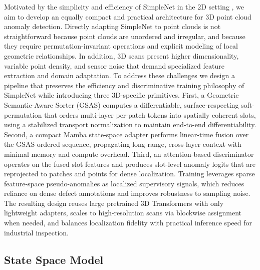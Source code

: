 Motivated by the simplicity and efficiency of SimpleNet in the 2D setting \cite{liu2023simplenet}, we aim to develop an equally compact and practical architecture for 3D point cloud anomaly detection. Directly adapting SimpleNet to point clouds is not straightforward because point clouds are unordered and irregular, and because they require permutation-invariant operations and explicit modeling of local geometric relationships. In addition, 3D scans present higher dimensionality, variable point density, and sensor noise that demand specialized feature extraction and domain adaptation. To address these challenges we design a pipeline that preserves the efficiency and discriminative training philosophy of SimpleNet while introducing three 3D-specific primitives. First, a Geometric Semantic-Aware Sorter (GSAS) computes a differentiable, surface-respecting soft-permutation that orders multi-layer per-patch tokens into spatially coherent slots, using a stabilized transport normalization to maintain end-to-end differentiability. Second, a compact Mamba state-space adapter performs linear-time fusion over the GSAS-ordered sequence, propagating long-range, cross-layer context with minimal memory and compute overhead. Third, an attention-based discriminator operates on the fused slot features and produces slot-level anomaly logits that are reprojected to patches and points for dense localization. Training leverages sparse feature-space pseudo-anomalies as localized supervisory signals, which reduces reliance on dense defect annotations and improves robustness to sampling noise. The resulting design reuses large pretrained 3D Transformers with only lightweight adapters, scales to high-resolution scans via blockwise assignment when needed, and balances localization fidelity with practical inference speed for industrial inspection.

\subsection{State Space Model}

